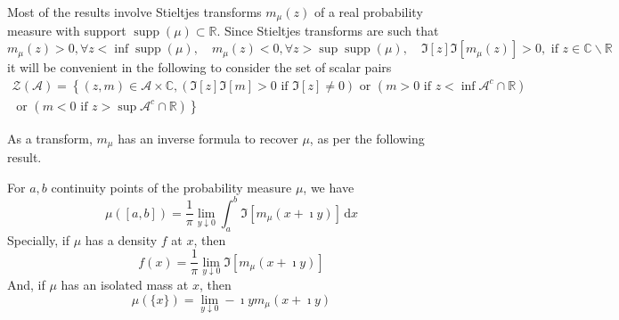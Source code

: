 \begin{remark}
    Most of the results involve Stieltjes transforms $m_{\mu}(z)$ of a real probability measure with support $\operatorname{supp}(\mu) \subset \mathbb{R} .$ Since Stieltjes transforms are such that 
    \begin{equation*}
        m_{\mu}(z)>0,\forall z<\inf\operatorname{supp}(\mu),\quad m_{\mu}(z)<0,\forall z>\sup \operatorname{supp}(\mu),\quad\Im[z] \Im\left[m_{\mu}(z)\right]>0,\text{ if }z\in\mathbb{C}\backslash\mathbb{R}
    \end{equation*}
    it will be convenient in the following to consider the set of scalar pairs
    \begin{equation*}
        \begin{array}{c}
            \mathcal{Z}(\mathcal{A})=\left\{(z,m)\in\mathcal{A}\times\mathbb{C},(\Im[z]\Im[m]>0\text{ if } \Im[z] \neq 0)\text{ or }\left(m>0\text{ if }z<\inf \mathcal{A}^{c} \cap \mathbb{R}\right)\right. \\
            \left.\text{ or }\left(m<0\text{ if }z>\sup \mathcal{A}^{c} \cap \mathbb{R}\right)\right\}
        \end{array}
    \end{equation*}
\end{remark}

As a transform, $m_{\mu}$ has an inverse formula to recover $\mu$, as per the following result.

\begin{theorem} \label{thm:inverse-stieltjes-transform}
    For $a,b$ continuity points of the probability measure $\mu$, we have
    \begin{equation}
        \mu\left([a,b]\right)=\frac{1}{\pi}\lim_{y\downarrow 0}\int_{a}^{b}\Im\left[m_{\mu}(x+\imath y)\right]\,\mathrm{d}x
    \end{equation}
    Specially, if $\mu$ has a density $f$ at $x$, then
    \begin{equation}
        f(x)=\frac{1}{\pi}\lim_{y\downarrow 0}\Im\left[m_{\mu}(x+\imath y)\right]
    \end{equation}
    And, if $\mu$ has an isolated mass at $x$, then
    \begin{equation}
        \mu(\{x\})=\lim_{y \downarrow 0}-\imath y m_{\mu}(x+\imath y)
    \end{equation}
\end{theorem}

